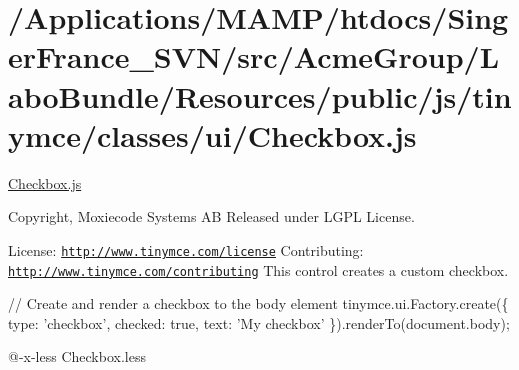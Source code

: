 \hypertarget{_2_applications_2_m_a_m_p_2htdocs_2_singer_france__s_v_n_2src_2_acme_group_2_labo_bundle_2_resoud906ad1c3db3cc42d0dc8760937c4dfa}{\section{/\+Applications/\+M\+A\+M\+P/htdocs/\+Singer\+France\+\_\+\+S\+V\+N/src/\+Acme\+Group/\+Labo\+Bundle/\+Resources/public/js/tinymce/classes/ui/\+Checkbox.\+js}
}
\hyperlink{_checkbox_8js}{Checkbox.\+js}

Copyright, Moxiecode Systems A\+B Released under L\+G\+P\+L License.

License\+: \href{http://www.tinymce.com/license}{\tt http\+://www.\+tinymce.\+com/license} Contributing\+: \href{http://www.tinymce.com/contributing}{\tt http\+://www.\+tinymce.\+com/contributing} This control creates a custom checkbox.

// Create and render a checkbox to the body element tinymce.\+ui.\+Factory.\+create(\{ type\+: 'checkbox', checked\+: true, text\+: 'My checkbox' \}).render\+To(document.\+body);

@-\/x-\/less Checkbox.\+less


\begin{DoxyCodeInclude}
\end{DoxyCodeInclude}
 
